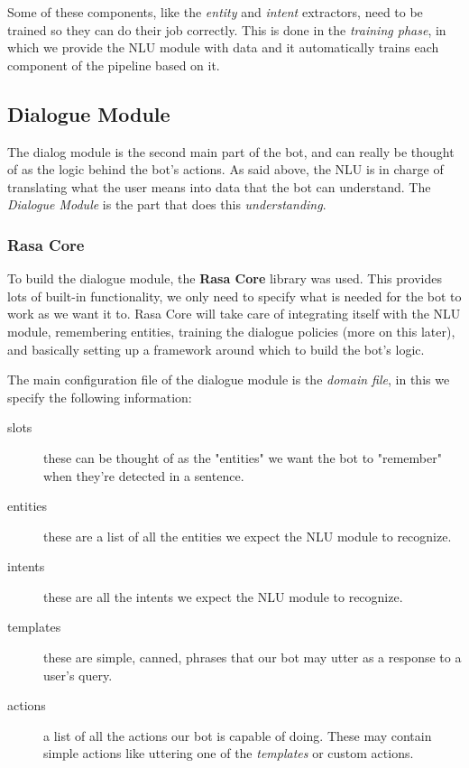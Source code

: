 \documentclass[11pt,a4paper]{article}
\begin{document}
			Some of these components, like the \textit{entity} and \textit{intent} extractors, need to be trained so they can do their job correctly. This is done in the \textit{training phase}, in which we provide the NLU module with data and it automatically trains each component of the pipeline based on it.


	\subsection{Dialogue Module}
	\label{ssec-dialogue-module}
		
		The dialog module is the second main part of the bot, and can really be thought of as the logic behind the bot's actions. As said above, the NLU is in charge of translating what the user means into data that the bot can understand. The \textit{Dialogue Module} is the part that does this \textit{understanding}.
		
		
		\subsubsection{Rasa Core}
		\label{ssec-rasa-core}	
		
			To build the dialogue module, the \textbf{Rasa Core} \cite{rasacore} library was used. This provides lots of built-in functionality, we only need to specify what is needed for the bot to work as we want it to. Rasa Core will take care of integrating itself with the NLU module, remembering entities, training the dialogue policies (more on this later), and basically setting up a framework around which to build the bot's logic. 
			
			The main configuration file of the dialogue module is the \textit{domain file}, in this we specify the following information:
			
			\begin{description}
				\item[slots] these can be thought of as the "entities" we want the bot to "remember" when they're detected in a sentence.
				\item[entities] these are a list of all the entities we expect the NLU module to recognize.
				\item[intents] these are all the intents we expect the NLU module to recognize.
				\item[templates] these are simple, canned, phrases that our bot may utter as a response to a user's query.
				\item[actions] a list of all the actions our bot is capable of doing. These may contain simple actions like uttering one of the \textit{templates} or custom actions.
			\end{description}
			
\end{document}
